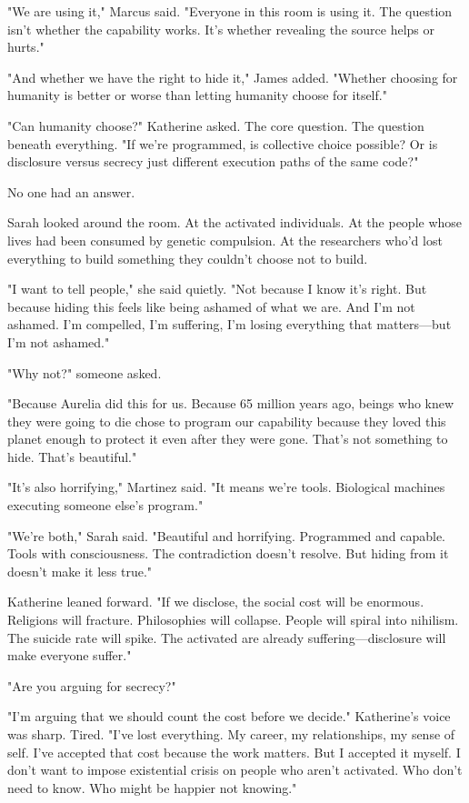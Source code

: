 "We are using it," Marcus said. "Everyone in this room is using it. The question isn't whether the capability works. It's whether revealing the source helps or hurts."

"And whether we have the right to hide it," James added. "Whether choosing for humanity is better or worse than letting humanity choose for itself."

"Can humanity choose?" Katherine asked. The core question. The question beneath everything. "If we're programmed, is collective choice possible? Or is disclosure versus secrecy just different execution paths of the same code?"

No one had an answer.

Sarah looked around the room. At the activated individuals. At the people whose lives had been consumed by genetic compulsion. At the researchers who'd lost everything to build something they couldn't choose not to build.

"I want to tell people," she said quietly. "Not because I know it's right. But because hiding this feels like being ashamed of what we are. And I'm not ashamed. I'm compelled, I'm suffering, I'm losing everything that matters—but I'm not ashamed."

"Why not?" someone asked.

"Because Aurelia did this for us. Because 65 million years ago, beings who knew they were going to die chose to program our capability because they loved this planet enough to protect it even after they were gone. That's not something to hide. That's beautiful."

"It's also horrifying," Martinez said. "It means we're tools. Biological machines executing someone else's program."

"We're both," Sarah said. "Beautiful and horrifying. Programmed and capable. Tools with consciousness. The contradiction doesn't resolve. But hiding from it doesn't make it less true."

Katherine leaned forward. "If we disclose, the social cost will be enormous. Religions will fracture. Philosophies will collapse. People will spiral into nihilism. The suicide rate will spike. The activated are already suffering—disclosure will make everyone suffer."

"Are you arguing for secrecy?"

"I'm arguing that we should count the cost before we decide." Katherine's voice was sharp. Tired. "I've lost everything. My career, my relationships, my sense of self. I've accepted that cost because the work matters. But I accepted it myself. I don't want to impose existential crisis on people who aren't activated. Who don't need to know. Who might be happier not knowing."

